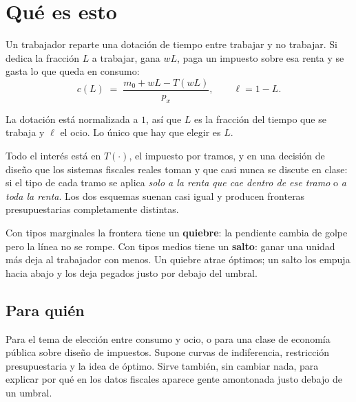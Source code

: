 \documentclass[11pt,a4paper]{appletmanual}
\begin{document}

\manualtoc
\thispagestyle{empty}
\clearpage
\setcounter{page}{1}

\section{Qué es esto}

Un trabajador reparte una dotación de tiempo entre trabajar y no trabajar. Si
dedica la fracción $L$ a trabajar, gana $wL$, paga un impuesto sobre esa renta
y se gasta lo que queda en consumo:
\[
  c(L) \;=\; \frac{m_0 + wL - T(wL)}{p_x},
  \qquad \ell = 1 - L .
\]

La dotación está normalizada a $1$, así que $L$ es la fracción del tiempo que
se trabaja y $\ell$ el ocio. Lo único que hay que elegir es $L$.

Todo el interés está en $T(\cdot)$, el impuesto por tramos, y en una decisión de
diseño que los sistemas fiscales reales toman y que casi nunca se discute en
clase: si el tipo de cada tramo se aplica \emph{solo a la renta que cae dentro
de ese tramo} o \emph{a toda la renta}. Los dos esquemas suenan casi igual y
producen fronteras presupuestarias completamente distintas.


\begin{amkey}
Con tipos marginales la frontera tiene un \textbf{quiebre}: la pendiente cambia
de golpe pero la línea no se rompe. Con tipos medios tiene un
\textbf{salto}: ganar una unidad más deja al trabajador con menos. Un quiebre
atrae óptimos; un salto los empuja hacia abajo y los deja pegados justo por
debajo del umbral.
\end{amkey}

\subsection{Para quién}

Para el tema de elección entre consumo y ocio, o para una clase de economía
pública sobre diseño de impuestos. Supone curvas de indiferencia, restricción
presupuestaria y la idea de óptimo. Sirve también, sin cambiar nada, para
explicar por qué en los datos fiscales aparece gente amontonada justo debajo de
un umbral.
\end{document}
